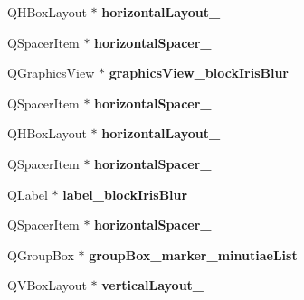 \begin{DoxyCompactItemize}
\mbox{\label{class_ui___main_window_a2071e5a4c77a64f74d74ac246bbc683c}} 
Q\+H\+Box\+Layout $\ast$ {\bfseries horizontal\+Layout\+\_}
\item 
\mbox{\label{class_ui___main_window_a891722aae0849c6010c8c535c8a9f1e8}} 
Q\+Spacer\+Item $\ast$ {\bfseries horizontal\+Spacer\+\_}
\item 
\mbox{\label{class_ui___main_window_a093868e1143b302b2c1a44aa69624697}} 
Q\+Graphics\+View $\ast$ {\bfseries graphics\+View\+\_\+block\+Iris\+Blur}
\item 
\mbox{\label{class_ui___main_window_a79d9abb425faf54115e540fab7bd1a14}} 
Q\+Spacer\+Item $\ast$ {\bfseries horizontal\+Spacer\+\_}
\item 
\mbox{\label{class_ui___main_window_a17c8bb967f8ecc58406ac7ca1bec7b7e}} 
Q\+H\+Box\+Layout $\ast$ {\bfseries horizontal\+Layout\+\_}
\item 
\mbox{\label{class_ui___main_window_a8299c833a893aa2069e6f7ad2f91cd87}} 
Q\+Spacer\+Item $\ast$ {\bfseries horizontal\+Spacer\+\_}
\item 
\mbox{\label{class_ui___main_window_a3fc39275beac0f67912189e32bc09218}} 
Q\+Label $\ast$ {\bfseries label\+\_\+block\+Iris\+Blur}
\item 
\mbox{\label{class_ui___main_window_a803124d27002591fb6919fa2064312a6}} 
Q\+Spacer\+Item $\ast$ {\bfseries horizontal\+Spacer\+\_}
\item 
\mbox{\label{class_ui___main_window_ae6b2a27912bcf204db0d1cac6bb3e60e}} 
Q\+Group\+Box $\ast$ {\bfseries group\+Box\+\_\+marker\+\_\+minutiae\+List}
\item 
\mbox{\label{class_ui___main_window_a6f40fc110b15410c00837a446d57bdbe}} 
Q\+V\+Box\+Layout $\ast$ {\bfseries vertical\+Layout\+\_}
\item 
\mbox{\label{class_ui___main_window_afd8f63db0dc7063f1ebdee1cada8ad81}} 

\end{DoxyCompactItemize}
